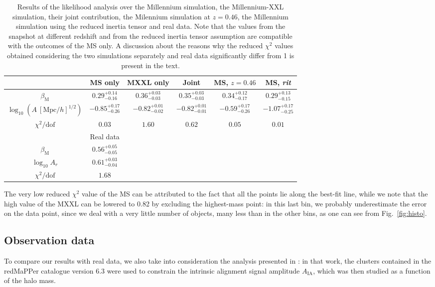 \documentclass[a4paper,fleqn,usenatbib]{mnras}
\begin{document}
\begin{table*}
	\centering
	\caption{Results of the likelihood analysis over the Millennium simulation, the Millennium-XXL simulation, their joint contribution, the Milennium simulation at $z = 0.46$, the Millennium simulation using the reduced inertia tensor and real data. Note that the values from the snapshot at different redshift and from the reduced inertia tensor assumption are compatible with the outcomes of the MS only. A discussion about the reasons why the reduced $\chi^2$ values obtained considering the two simulations separately and real data significantly differ from 1 is present in the text.}
	\label{tab:param}
	\begin{tabular}{c||ccccc} %
		\hline \hline
		\ & MS only & MXXL only & Joint & MS, $z=0.46$ & MS, \textit{rit} \\
		\hline
		$\beta_{\mathrm{M}}$					  & $0.29^{+0.14}_{-0.16}$   & $0.36^{+0.03}_{-0.03}$  & $0.35^{+0.03}_{-0.03}$ &  $0.34^{+0.12}_{-0.17}$ & $0.29^{+0.13}_{-0.15}$ \\
		$\log_{10} (A \ [\mbox{Mpc}/h]^{1/2})$ & $-0.85^{+0.17}_{-0.26}$ & $-0.82^{+0.01}_{-0.02}$ & $-0.82^{+0.01}_{-0.01}$&$-0.59^{+0.17}_{-0.26}$&  $-1.07^{+0.17}_{-0.25}$\\
		$\chi^2 / \mbox{dof}$			  & $0.03$                                 & $1.60$			 & $0.62$			    & $0.05$			      & $0.01$	 \\
		\hline \hline
		\ & Real data & \ & \ \\
		\hline
		$\beta_{\mathrm{M}}$ & $0.56^{+0.05}_{-0.05}$ & &\\
		$\log_{10} A_r $ & $0.61^{+0.03}_{-0.04}$ & & & & \\
		$\chi^2 / \mbox{dof}$			  & $1.68$  & & & & \\
		\hline \hline 
		\end{tabular}
\end{table*}

The very low reduced $\chi^2$ value of the MS can be attributed to the fact that all the points lie along the best-fit line, while we note that the high value of the MXXL can be lowered to 0.82 by excluding the highest-mass point: in this last bin, we probably underestimate the error on the data point, since we deal with a very little number of objects, many less than in the other bins, as one can see from Fig.~\ref{fig:histo}.
\subsection{Observation data}
\label{subsec:obsdatard}
To compare our results with real data, we also take into consideration the analysis presented in \citet{vanUitertJoachimi2017}: in that work, the clusters contained in the redMaPPer catalogue \citep{Rykoffetal2014} version 6.3 were used to constrain the intrinsic alignment signal amplitude $A_{\mathrm{IA}}$, which was then studied as a function of the halo mass.
\end{document}
